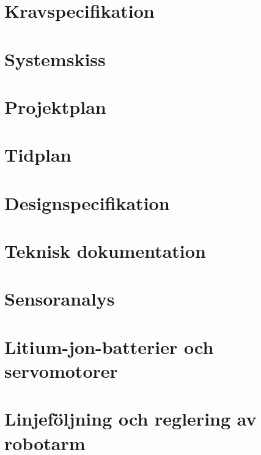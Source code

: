 

\section{Kravspecifikation}
\label{sec:kravspec}

\section{Systemskiss}
\label{sec:systemskiss}

\section{Projektplan}
\label{sec:projektplan}

\section{Tidplan}
\label{sec:tidplan}

\section{Designspecifikation}
\label{sec:designspec}

\section{Teknisk dokumentation}
\label{sec:tekdok}

\section{Sensoranalys}
\label{sec:sensoruppgift}

\section{Litium-jon-batterier och servomotorer}
\label{sec:batteriservouppgift}

\section{Linjeföljning och reglering av robotarm}
\label{sec:regleruppgift}


